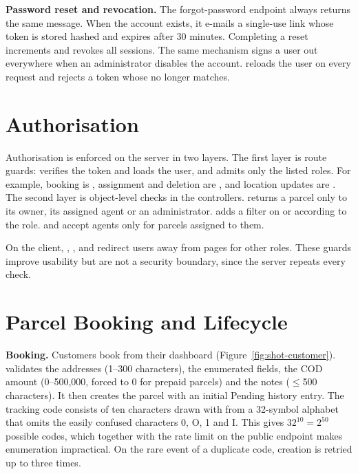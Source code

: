 \textbf{Password reset and revocation.} The forgot-password endpoint always returns the same message. When the account exists, it e-mails a single-use link whose token is stored hashed and expires after 30 minutes. Completing a reset increments  and revokes all sessions. The same mechanism signs a user out everywhere when an administrator disables the account.  reloads the user on every request and rejects a token whose  no longer matches.

\section{Authorisation}
\label{sec:impl-authz}

Authorisation is enforced on the server in two layers. The first layer is route guards:  verifies the token and loads the user, and  admits only the listed roles. For example, booking is , assignment and deletion are , and location updates are . The second layer is object-level checks in the controllers.  returns a parcel only to its owner, its assigned agent or an administrator.  adds a filter on  or  according to the role.  and  accept agents only for parcels assigned to them.

On the client, , ,  and  redirect users away from pages for other roles. These guards improve usability but are not a security boundary, since the server repeats every check.

\section{Parcel Booking and Lifecycle}
\label{sec:impl-lifecycle}

\textbf{Booking.} Customers book from their dashboard (Figure~\ref{fig:shot-customer}).  validates the addresses (1--300 characters), the enumerated fields, the COD amount (0--500{,}000, forced to 0 for prepaid parcels) and the notes ($\leq$500 characters). It then creates the parcel with an initial Pending history entry. The tracking code consists of ten characters drawn with  from a 32-symbol alphabet that omits the easily confused characters 0, O, 1 and I. This gives $32^{10} = 2^{50}$ possible codes, which together with the rate limit on the public endpoint makes enumeration impractical. On the rare event of a duplicate code, creation is retried up to three times.

